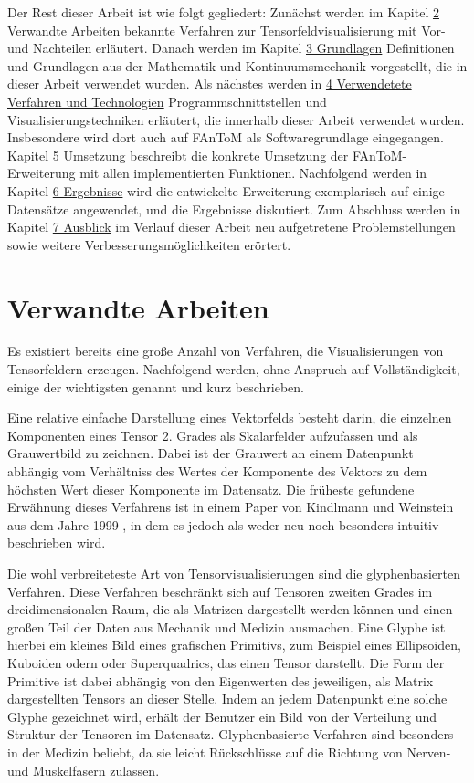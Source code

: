 \documentclass[a4paper,fontsize=12pt,toc=bib,halfparskip]{scrartcl}
\begin{document}
Der Rest dieser Arbeit ist wie folgt gegliedert: Zun\"achst werden im Kapitel \hyperref[sec:Verwandte]{2 Verwandte Arbeiten} bekannte Verfahren zur Tensorfeldvisualisierung mit Vor- und Nachteilen erl\"autert. Danach werden im Kapitel \hyperref[sec:Grundlagen]{3 Grundlagen} Definitionen und Grundlagen aus der Mathematik und Kontinuumsmechanik vorgestellt, die in dieser Arbeit verwendet wurden. Als n\"achstes werden in \hyperref[sec:Technologien]{4 Verwendetete Verfahren und Technologien} Programmschnittstellen und Visualisierungstechniken erl\"autert, die innerhalb dieser Arbeit verwendet wurden. Insbesondere wird dort auch auf FAnToM als Softwaregrundlage eingegangen. Kapitel \hyperref[sec:Umsetzung]{5 Umsetzung} beschreibt die konkrete Umsetzung der FAnToM-Erweiterung mit allen implementierten Funktionen. Nachfolgend werden in Kapitel \hyperref[sec:Ergebnisse]{6 Ergebnisse} wird die entwickelte Erweiterung exemplarisch auf einige Datens\"atze angewendet, und die Ergebnisse diskutiert. Zum Abschluss werden in Kapitel \hyperref[sec:Ausblick]{7 Ausblick} im Verlauf dieser Arbeit neu aufgetretene Problemstellungen sowie weitere Verbesserungsm\"oglichkeiten er\"ortert.
 
\section{Verwandte Arbeiten}
\label{sec:Verwandte}
Es existiert bereits eine gro{\ss}e Anzahl von Verfahren, die Visualisierungen von Tensorfeldern erzeugen. Nachfolgend werden, ohne Anspruch auf Vollst\"andigkeit, einige der wichtigsten genannt und kurz beschrieben.

Eine relative einfache Darstellung eines Vektorfelds besteht darin, die einzelnen Komponenten eines Tensor 2. Grades als Skalarfelder aufzufassen und als Grauwertbild zu zeichnen. Dabei ist der Grauwert an einem Datenpunkt abh\"angig vom Verh\"altniss des Wertes der Komponente des Vektors zu dem h\"ochsten Wert dieser Komponente im Datensatz. Die fr\"uheste gefundene Erw\"ahnung dieses Verfahrens ist in einem Paper von Kindlmann und Weinstein aus dem Jahre 1999 \cite{kindlmann1999hue}, in dem es jedoch als weder neu noch besonders intuitiv beschrieben wird. 

Die wohl verbreiteteste Art von Tensorvisualisierungen sind die glyphenbasierten Verfahren. Diese Verfahren beschr\"ankt sich auf Tensoren zweiten Grades im dreidimensionalen Raum, die als Matrizen dargestellt werden k\"onnen und einen gro{\ss}en Teil der Daten aus Mechanik und Medizin ausmachen. Eine Glyphe ist hierbei ein kleines Bild eines grafischen Primitivs, zum Beispiel eines Ellipsoiden, Kuboiden odern oder Superquadrics\cite{kindlmann2004superquadric}, das einen Tensor darstellt. Die Form der Primitive ist dabei abh\"angig von den Eigenwerten des jeweiligen, als Matrix dargestellten Tensors an dieser Stelle. Indem an jedem Datenpunkt eine solche Glyphe gezeichnet wird, erh\"alt der Benutzer ein Bild von der Verteilung und Struktur der Tensoren im Datensatz. Glyphenbasierte Verfahren sind besonders in der Medizin beliebt, da sie leicht R\"uckschl\"usse auf die Richtung von Nerven- und Muskelfasern zulassen.
\end{document}
